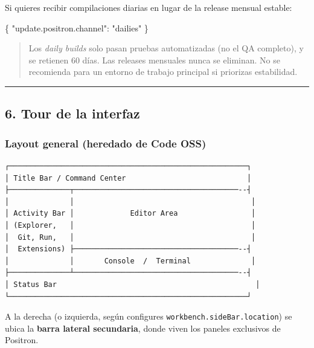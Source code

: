 \documentclass[
  doc,
  floatsintext,
  longtable,
  a4paper,
  nolmodern,
  notxfonts,
  notimes,
  12pt,
  colorlinks=true,linkcolor=blue,citecolor=blue,urlcolor=blue]{apa7}
\newenvironment{Shaded}{\begin{snugshade}}{\end{snugshade}}
\newcommand{\DataTypeTok}[1]{\textcolor[rgb]{0.68,0.00,0.00}{#1}}
\newcommand{\FunctionTok}[1]{\textcolor[rgb]{0.28,0.35,0.67}{#1}}
\newcommand{\StringTok}[1]{\textcolor[rgb]{0.13,0.47,0.30}{#1}}
\begin{document}
Si quieres recibir compilaciones diarias en lugar de la release mensual
estable:

\begin{Shaded}
\begin{Highlighting}[]
\FunctionTok{\{}
  \DataTypeTok{"update.positron.channel"}\FunctionTok{:} \StringTok{"dailies"}
\FunctionTok{\}}
\end{Highlighting}
\end{Shaded}

\begin{quote}
Los \emph{daily builds} solo pasan pruebas automatizadas (no el QA
completo), y se retienen 60 días. Las releases mensuales nunca se
eliminan. No se recomienda para un entorno de trabajo principal si
priorizas estabilidad.
\end{quote}

\begin{center}\rule{0.5\linewidth}{0.5pt}\end{center}

\subsection{6. Tour de la interfaz}\label{tour-de-la-interfaz}

\subsubsection{Layout general (heredado de Code
OSS)}\label{layout-general-heredado-de-code-oss}

\begin{verbatim}
┌───────────────────────────────────────────────────────┐
│ Title Bar / Command Center                            │
├──────────────┬──────────────────────────────────────--┤
│              │                                         │
│ Activity Bar │             Editor Area                 │
│ (Explorer,   │                                         │
│  Git, Run,   │                                         │
│  Extensions) ├──────────────────────────────────────--┤
│              │       Console  /  Terminal              │
├──────────────┴──────────────────────────────────────--┤
│ Status Bar                                              │
└───────────────────────────────────────────────────────┘
\end{verbatim}

A la derecha (o izquierda, según configures
\texttt{workbench.sideBar.location}) se ubica la \textbf{barra lateral
secundaria}, donde viven los paneles exclusivos de Positron.
\end{document}
